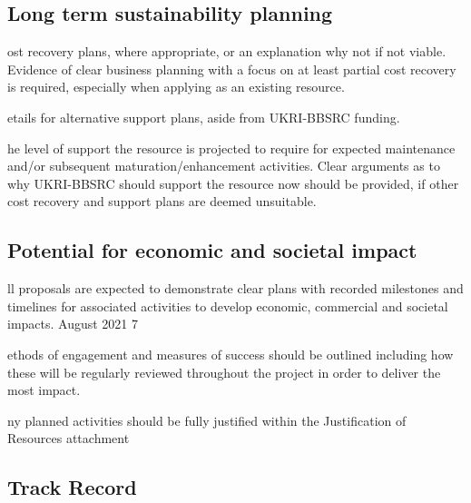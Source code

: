 \documentclass[a4paper,11point]{article}
\def\ii#1\par{{\color{blue!40}\sl #1}\par}
\def\iitem#1\par{\ii\begin{itemize}[nosep]\item #1 \end{itemize}\par}
\begin{document}
\subsection{Long term sustainability planning}
\ii{
In addition, the case for support should outline considerations for the long-
term sustainability of the resource beyond UKRI-BBSRC funding, as well as 
the true cost of running and maintaining the resource in question. 
The proposal should include: }

\iitem Cost recovery plans, where appropriate, or an explanation why
not if not viable. Evidence of clear business planning with a focus on
at least partial cost recovery is required, especially when applying
as an existing resource.

\iitem Details for alternative support plans, aside from UKRI-BBSRC 
funding. 

\iitem The level of support the resource is projected to require for expected 
maintenance and/or subsequent maturation/enhancement activities. 
Clear arguments as to why UKRI-BBSRC should support the resource now 
should be provided, if other cost recovery and support plans are deemed 
unsuitable.  


\subsection{Potential for economic and societal impact}
\ii{Outline how the outputs of the proposed resource will contribute to 
knowledge and how this may have the potential for economic return or 
societal benefits. Impact activities should be integrated into appropriate 
sections of the case for support, not presented as an independent work 
package. }

\iitem All proposals are expected to demonstrate clear plans with recorded 
milestones and timelines for associated activities to develop 
economic, commercial and societal impacts.  
August 2021 7 
 

\iitem Methods of engagement and measures of success should be outlined 
including how these will be regularly reviewed throughout the project 
in order to deliver the most impact. 

\iitem Any planned activities should be fully justified within the Justification 
of Resources attachment








\subsection{Track Record}
\ii{
The majority of the track record relevant to the project should be located 
within the Narrative CV and should not be repeated within the case for 
support. You may, however, want to describe: }
\end{document}
